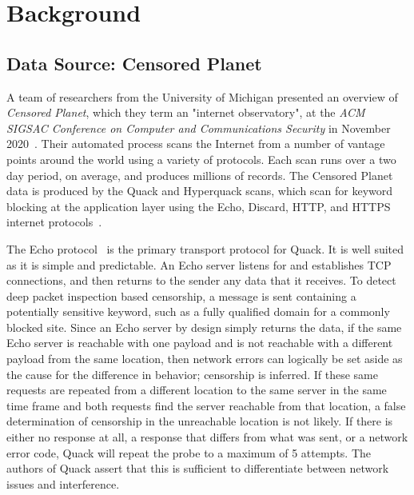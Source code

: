\section{Background}\label{sec:background}

\subsection{Data Source: Censored Planet}

A team of researchers from the University of Michigan presented an overview of
\textit{Censored Planet}, which they term an "internet observatory", at the
\textit{ACM SIGSAC Conference on Computer and Communications Security} in
November 2020~\cite{sundara_raman_censored_2020}. Their automated process scans
the Internet from a number of vantage points around the world using a variety
of protocols.  Each scan runs over a two day period, on average, and produces
millions of records. The Censored Planet data is produced by the Quack and
Hyperquack scans, which scan for keyword blocking at the application layer
using the Echo, Discard, HTTP, and HTTPS internet
protocols~\cite{vandersloot_quack_2018,raman_hyperquack-v1_2020}.

The Echo protocol~\cite{postel_rfc_1983} is the primary transport protocol for
Quack. It is well suited as it is simple and predictable.  An Echo server
listens for and establishes TCP connections, and then returns to the sender any
data that it receives. To detect deep packet inspection based censorship, a
message is sent containing a potentially sensitive keyword, such as a fully
qualified domain for a commonly blocked site. Since an Echo server by design
simply returns the data, if the same Echo server is reachable with one payload
and is not reachable with a different payload from the same location, then
network errors can logically be set aside as the cause for the difference in
behavior; censorship is inferred.  If these same requests are repeated from a
different location to the same server in the same time frame and both requests
find the server reachable from that location, a false determination of
censorship in the unreachable location is not likely. If there is either no
response at all, a response that differs from what was sent, or a network error
code, Quack will repeat the probe to a maximum of 5 attempts. The authors of
Quack assert that this is sufficient to differentiate between network issues
and interference.

